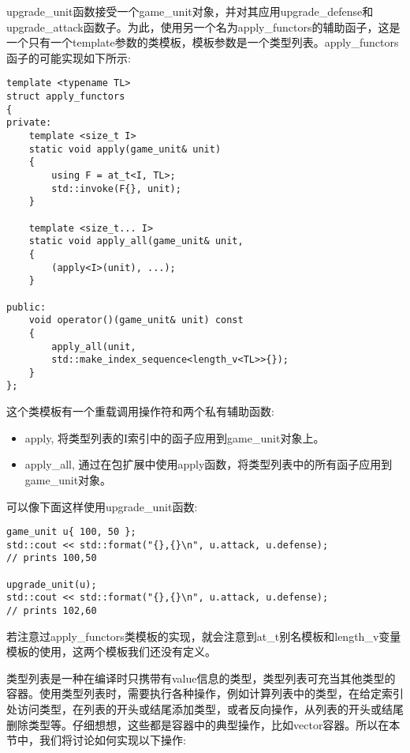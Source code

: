 upgrade\_unit函数接受一个game\_unit对象，并对其应用upgrade\_defense和upgrade\_attack函数子。为此，使用另一个名为apply\_functors的辅助函子，这是一个只有一个template参数的类模板，模板参数是一个类型列表。apply\_functors函子的可能实现如下所示:

\begin{lstlisting}[style=styleCXX]
template <typename TL>
struct apply_functors
{
private:
	template <size_t I>
	static void apply(game_unit& unit)
	{
		using F = at_t<I, TL>;
		std::invoke(F{}, unit);
	}

	template <size_t... I>
	static void apply_all(game_unit& unit,
	{
		(apply<I>(unit), ...);
	}

public:
	void operator()(game_unit& unit) const
	{
		apply_all(unit,
		std::make_index_sequence<length_v<TL>>{});
	}
};
\end{lstlisting}

这个类模板有一个重载调用操作符和两个私有辅助函数:

\begin{itemize}
\item
apply, 将类型列表的I索引中的函子应用到game\_unit对象上。

\item
apply\_all, 通过在包扩展中使用apply函数，将类型列表中的所有函子应用到game\_unit对象。
\end{itemize}

可以像下面这样使用upgrade\_unit函数:

\begin{lstlisting}[style=styleCXX]
game_unit u{ 100, 50 };
std::cout << std::format("{},{}\n", u.attack, u.defense);
// prints 100,50

upgrade_unit(u);
std::cout << std::format("{},{}\n", u.attack, u.defense);
// prints 102,60
\end{lstlisting}

若注意过apply\_functors类模板的实现，就会注意到at\_t别名模板和length\_v变量模板的使用，这两个模板我们还没有定义。


类型列表是一种在编译时只携带有value信息的类型，类型列表可充当其他类型的容器。使用类型列表时，需要执行各种操作，例如计算列表中的类型，在给定索引处访问类型，在列表的开头或结尾添加类型，或者反向操作，从列表的开头或结尾删除类型等。仔细想想，这些都是容器中的典型操作，比如vector容器。所以在本节中，我们将讨论如何实现以下操作:

